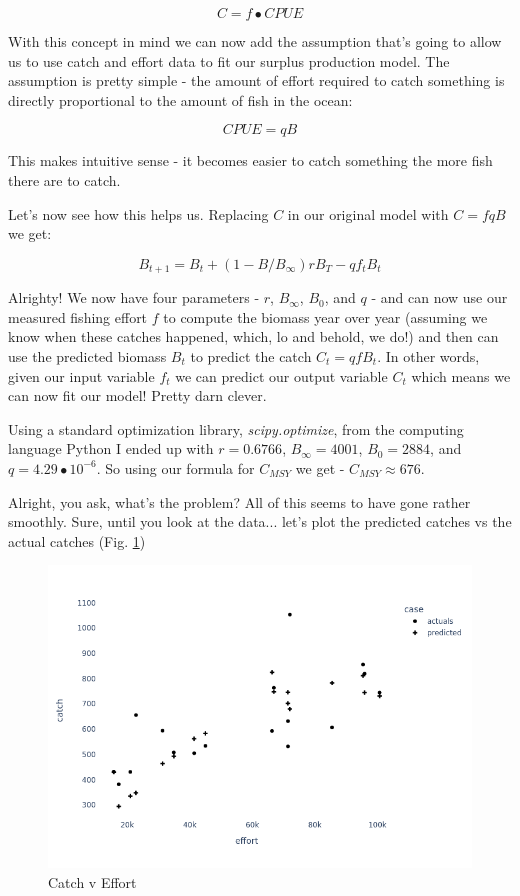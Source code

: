 \documentclass[11pt,a5paper]{book}
\begin{document}
$$C = f\bullet CPUE$$

With this concept in mind we can now add the assumption that's going to allow us to use catch and effort data to fit our surplus production model. The assumption is pretty simple - the amount of effort required to catch something is directly proportional to the amount of fish in the ocean:

$$CPUE = qB$$

This makes intuitive sense - it becomes easier to catch something the more fish there are to catch. 
\newline

Let's now see how this helps us. Replacing $C$ in our original model with $C=fqB$ we get:

$$B_{t+1} = B_t + (1 - B/B_\infty)rB_T - qf_tB_t$$

Alrighty! We now have four parameters - $r$, $B_\infty$, $B_0$, and $q$ - and can now use our measured fishing effort $f$ to compute the biomass year over year (assuming we know when these catches happened, which, lo and behold, we do!) and then can use the predicted biomass $B_t$ to predict the catch $C_t = qfB_t$. In other words, given our input variable $f_t$ we can predict our output variable $C_t$ which means we can now fit our model! Pretty darn clever. 
\newline

Using a standard optimization library, \textit{scipy.optimize}, from the computing language Python I ended up with $r=0.6766$, $B_\infty = 4001$, $B_0 =2884$, and $q=4.29\bullet 10^{-6}$. So using our formula for $C_{MSY}$ we get - $C_{MSY}\approx 676$.
\newline

Alright, you ask, what's the problem? All of this seems to have gone rather smoothly. Sure, until you look at the data... let's plot the predicted catches vs the actual catches (Fig. \ref{fig:predictions_surplus})
\newline

\begin{figure}[h!] 
  \includegraphics[width=\linewidth]{notebooks/SurplusModels/model_scatter.png}
  \caption{Catch v Effort}
  \label{fig:predictions_surplus}
\end{figure}
\end{document}
